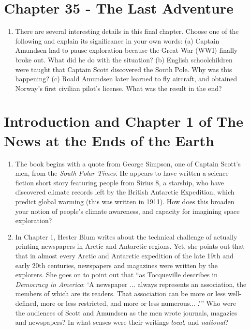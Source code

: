 \documentclass{article}
\begin{document}
\section{Chapter 35 - The Last Adventure}

\begin{enumerate}
\item There are several interesting details in this final chapter.  Choose one of the following and explain its significance in your own words: (a) Captain Amundsen had to pause exploration because the Great War (WWI) finally broke out.  What did he do with the situation?  (b) English schoolchildren were taught that Captain Scott discovered the South Pole.  Why was this happening? (c) Roald Amundsen later learned to fly aircraft, and obtained Norway's first civilian pilot's license.  What was the result in the end? \\ \vspace{2cm}
\end{enumerate}

\section{Introduction and Chapter 1 of The News at the Ends of the Earth}

\begin{enumerate}
\item The book begins with a quote from George Simpson, one of Captain Scott's men, from the \textit{South Polar Times}.  He appears to have written a science fiction short story featuring people from Sirius 8, a starship, who have discovered climate records left by the British Antarctic Expedition, which predict global warming (this was written in 1911).  How does this broaden your notion of people's climate awareness, and capacity for imagining space exploration? \\ \vspace{2cm}
\item In Chapter 1, Hester Blum writes about the technical challenge of actually printing newspapers in Arctic and Antarctic regions.  Yet, she points out that that in almost every Arctic and Antarctic expedition of the late 19th and early 20th centuries, newspapers and magazines were written by the explorers.  She goes on to point out that ``as Tocqueville describes in \textit{Democracy in America}: `A newspaper ... always represents an association, the members of which are its readers.  That association can be more or less well-defined, more or less restricted, and more or less numerous... .'''  Who were the audiences of Scott and Amundsen as the men wrote journals, magazies and newspapers?  In what senses were their writings \textit{local}, and \textit{national}? \\ \vspace{2cm}
\end{enumerate}
\end{document}
